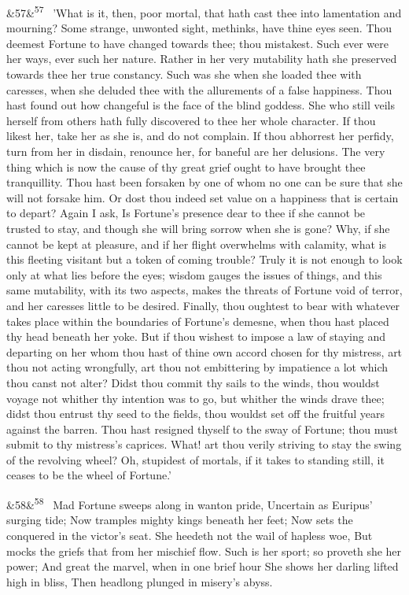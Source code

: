 \documentclass[12pt]{article}
\newcommand{\para}[1][]{\par\noindent\ifx&#1&\else\textsuperscript{\footnotesize #1}~\fi}
\begin{document}
\para[57] 'What is it, then, poor mortal, that hath cast thee into lamentation and mourning? Some strange, unwonted sight, methinks, have thine eyes seen. Thou deemest Fortune to have changed towards thee; thou mistakest. Such ever were her ways, ever such her nature. Rather in her very mutability hath she preserved towards thee her true constancy. Such was she when she loaded thee with caresses, when she deluded thee with the allurements of a false happiness. Thou hast found out how changeful is the face of the blind goddess. She who still veils herself from others hath fully discovered to thee her whole character. If thou likest her, take her as she is, and do not complain. If thou abhorrest her perfidy, turn from her in disdain, renounce her, for baneful are her delusions. The very thing which is now the cause of thy great grief ought to have brought thee tranquillity. Thou hast been forsaken by one of whom no one can be sure that she will not forsake him. Or dost thou indeed set value on a happiness that is certain to depart? Again I ask, Is Fortune's presence dear to thee if she cannot be trusted to stay, and though she will bring sorrow when she is gone? Why, if she cannot be kept at pleasure, and if her flight overwhelms with calamity, what is this fleeting visitant but a token of coming trouble? Truly it is not enough to look only at what lies before the eyes; wisdom gauges the issues of things, and this same mutability, with its two aspects, makes the threats of Fortune void of terror, and her caresses little to be desired. Finally, thou oughtest to bear with whatever takes place within the boundaries of Fortune's demesne, when thou hast placed thy head beneath her yoke. But if thou wishest to impose a law of staying and departing on her whom thou hast of thine own accord chosen for thy mistress, art thou not acting wrongfully, art thou not embittering by impatience a lot which thou canst not alter? Didst thou commit thy sails to the winds, thou wouldst voyage not whither thy intention was to go, but whither the winds drave thee; didst thou entrust thy seed to the fields, thou wouldst set off the fruitful years against the barren. Thou hast resigned thyself to the sway of Fortune; thou must submit to thy mistress's caprices. What! art thou verily striving to stay the swing of the revolving wheel? Oh, stupidest of mortals, if it takes to standing still, it ceases to be the wheel of Fortune.'

\para[58] Mad Fortune sweeps along in wanton pride, Uncertain as Euripus' surging tide; Now tramples mighty kings beneath her feet; Now sets the conquered in the victor's seat. She heedeth not the wail of hapless woe, But mocks the griefs that from her mischief flow. Such is her sport; so proveth she her power; And great the marvel, when in one brief hour She shows her darling lifted high in bliss, Then headlong plunged in misery's abyss.
\end{document}
